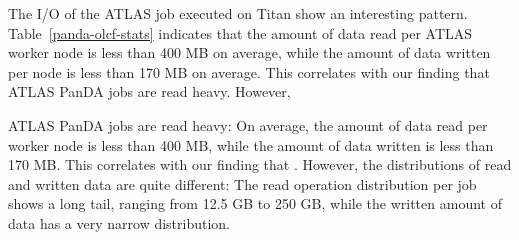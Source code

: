 %

The I/O of the ATLAS job executed on Titan show an interesting pattern.
Table~\ref{panda-olcf-stats} indicates that the amount of data read per ATLAS
worker node is less than 400 MB on average, while the amount of data written per
node is less than 170 MB on average. This correlates with our finding that ATLAS
PanDA jobs are read heavy. However,

ATLAS PanDA jobs are read heavy: On average, the amount of data read per worker
node is less than 400 MB, while the amount of data written is less than 170 MB.
This correlates with our finding that . However,
the distributions of read and written data are quite different: The read
operation distribution per job shows a long tail, ranging from 12.5 GB to 250
GB, while the written amount of data has a very narrow distribution.

%

